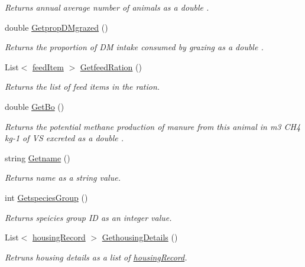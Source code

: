 \begin{DoxyCompactItemize}
\begin{DoxyCompactList}\small\item\em Returns annual average number of animals as a double . \end{DoxyCompactList}\item 
double \mbox{\hyperlink{classlivestock_a3199154ed8a6b458c8d355c4697422bd}{Getprop\+D\+Mgrazed}} ()
\begin{DoxyCompactList}\small\item\em Returns the proportion of DM intake consumed by grazing as a double . \end{DoxyCompactList}\item 
List$<$ \mbox{\hyperlink{classfeed_item}{feed\+Item}} $>$ \mbox{\hyperlink{classlivestock_ad34f357b0d2c43c8b919013227f50d8e}{Getfeed\+Ration}} ()
\begin{DoxyCompactList}\small\item\em Returns the list of feed items in the ration. \end{DoxyCompactList}\item 
double \mbox{\hyperlink{classlivestock_a9744aa8fa110c1b3625f100e3621f8d0}{Get\+Bo}} ()
\begin{DoxyCompactList}\small\item\em Returns the potential methane production of manure from this animal in m3 C\+H4 kg-\/1 of VS excreted as a double . \end{DoxyCompactList}\item 
string \mbox{\hyperlink{classlivestock_a2658697a2991be8744dbbf6d366cf5dd}{Getname}} ()
\begin{DoxyCompactList}\small\item\em Returns name as a string value. \end{DoxyCompactList}\item 
int \mbox{\hyperlink{classlivestock_a200482fb144d5a84bacd585f9d5cf8f5}{Getspecies\+Group}} ()
\begin{DoxyCompactList}\small\item\em Returns speicies group ID as an integer value. \end{DoxyCompactList}\item 
List$<$ \mbox{\hyperlink{structlivestock_1_1housing_record}{housing\+Record}} $>$ \mbox{\hyperlink{classlivestock_aa3e2e6b89d7fc483057d72a2a9a9d742}{Gethousing\+Details}} ()
\begin{DoxyCompactList}\small\item\em Retruns housing details as a list of \mbox{\hyperlink{structlivestock_1_1housing_record}{housing\+Record}}. \end{DoxyCompactList}\item 

\end{DoxyCompactItemize}
